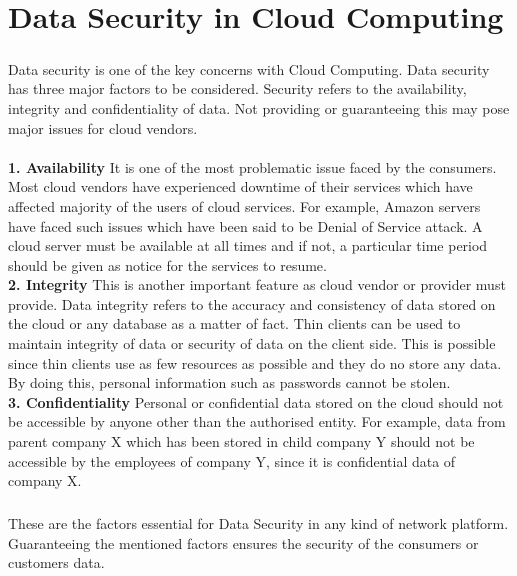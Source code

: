 \chapter{Data Security in Cloud Computing}
\paragraph{\hspace{24pt}}
Data security is one of the key concerns with Cloud Computing. Data security has three major factors to be considered. Security refers to the availability, integrity and confidentiality of data. Not providing or guaranteeing this may pose major issues for cloud vendors.\\\\
\textbf{1. Availability} {It is one of the most problematic issue faced by the consumers. Most cloud vendors have experienced downtime of their services which have affected majority of the users of cloud services. For example, Amazon servers have faced such issues which have been said to be Denial of Service attack. A cloud server must be available at all times and if not, a particular time period should be given as notice for the services to resume.}\\
\textbf{2. Integrity} {This is another important feature as cloud vendor or provider must provide. Data integrity refers to the accuracy and consistency of data stored on the cloud or any database as a matter of fact. Thin clients can be used to maintain integrity of data or security of data on the client side. This is possible since thin clients use as few resources as possible and they do no store any data. By doing this, personal information such as passwords cannot be stolen.}\\
\textbf{3. Confidentiality} {Personal or confidential data stored on the cloud should not be accessible by anyone other than the authorised entity. For example, data from parent company X which has been stored in child company Y should not be accessible by the employees of company Y, since it is confidential data of company X.}\\

\paragraph{\hspace{24pt}}
These are the factors essential for Data Security in any kind of network platform. Guaranteeing the mentioned factors ensures the security of the consumers or customers data.